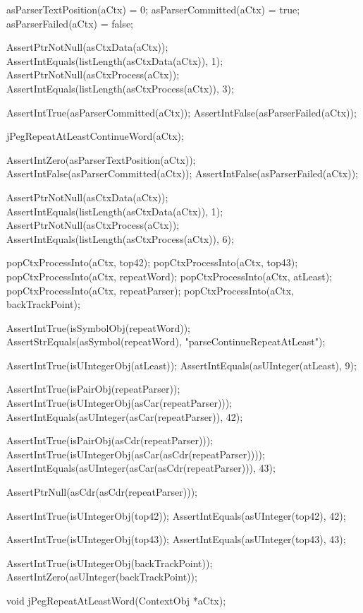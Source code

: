   asParserTextPosition(aCtx) = 0;
  asParserCommitted(aCtx)    = true;
  asParserFailed(aCtx)       = false;
  
  AssertPtrNotNull(asCtxData(aCtx));
  AssertIntEquals(listLength(asCtxData(aCtx)), 1);
  AssertPtrNotNull(asCtxProcess(aCtx));
  AssertIntEquals(listLength(asCtxProcess(aCtx)), 3);
  
  AssertIntTrue(asParserCommitted(aCtx));
  AssertIntFalse(asParserFailed(aCtx));
  
  jPegRepeatAtLeastContinueWord(aCtx);
  
  AssertIntZero(asParserTextPosition(aCtx));
  AssertIntFalse(asParserCommitted(aCtx));
  AssertIntFalse(asParserFailed(aCtx));
  
  AssertPtrNotNull(asCtxData(aCtx));
  AssertIntEquals(listLength(asCtxData(aCtx)), 1);
  AssertPtrNotNull(asCtxProcess(aCtx));
  AssertIntEquals(listLength(asCtxProcess(aCtx)), 6);
  
  popCtxProcessInto(aCtx, top42);
  popCtxProcessInto(aCtx, top43);
  popCtxProcessInto(aCtx, repeatWord);
  popCtxProcessInto(aCtx, atLeast);
  popCtxProcessInto(aCtx, repeatParser);
  popCtxProcessInto(aCtx, backTrackPoint);
  
  AssertIntTrue(isSymbolObj(repeatWord));
  AssertStrEquals(asSymbol(repeatWord), "parseContinueRepeatAtLeast");
  
  AssertIntTrue(isUIntegerObj(atLeast));
  AssertIntEquals(asUInteger(atLeast), 9);
  
  AssertIntTrue(isPairObj(repeatParser));
  AssertIntTrue(isUIntegerObj(asCar(repeatParser)));
  AssertIntEquals(asUInteger(asCar(repeatParser)), 42);
  
  AssertIntTrue(isPairObj(asCdr(repeatParser)));
  AssertIntTrue(isUIntegerObj(asCar(asCdr(repeatParser))));
  AssertIntEquals(asUInteger(asCar(asCdr(repeatParser))), 43);
  
  AssertPtrNull(asCdr(asCdr(repeatParser)));
  
  AssertIntTrue(isUIntegerObj(top42));
  AssertIntEquals(asUInteger(top42), 42);  

  AssertIntTrue(isUIntegerObj(top43));
  AssertIntEquals(asUInteger(top43), 43);
  
  AssertIntTrue(isUIntegerObj(backTrackPoint));
  AssertIntZero(asUInteger(backTrackPoint));
\stopCTest
\stopTestCase
\stopTestSuite

\startTestSuite[jPegRepeatAtLeastWord]

\startCHeader
void jPegRepeatAtLeastWord(ContextObj *aCtx);
\stopCHeader

